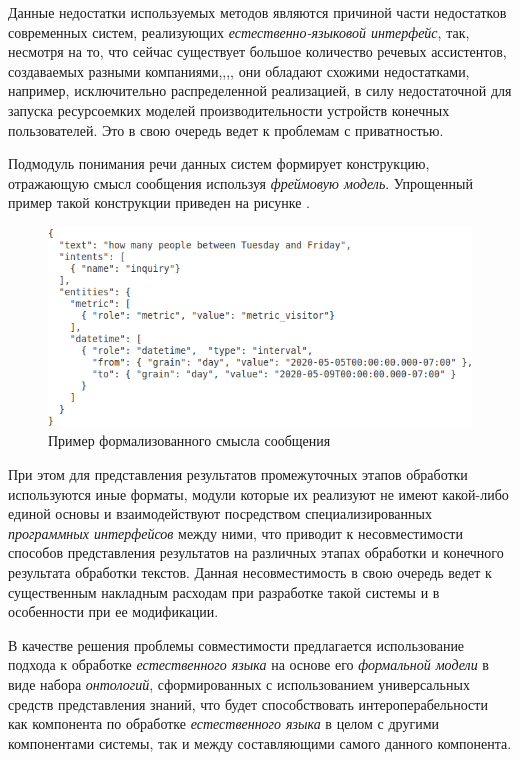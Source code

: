 Данные недостатки используемых методов являются причиной части недостатков современных систем, реализующих \textit{естественно-языковой интерфейс}, так, несмотря на то, что сейчас существует большое количество речевых ассистентов, создаваемых разными компаниями,,,, они обладают схожими недостатками, например, исключительно распределенной реализацией, в силу недостаточной для запуска ресурсоемких моделей производительности устройств конечных пользователей.
Это в свою очередь ведет к проблемам с приватностью.

Подмодуль понимания речи данных систем формирует конструкцию, отражающую смысл сообщения используя \textit{фреймовую модель}.
Упрощенный пример такой конструкции приведен на рисунке \textit{}.

\begin{figure}[h]
    \centerline{\includegraphics[scale=0.55]{images/part4/chapter_nl_interfaces/message_intents}}
    \caption{Пример формализованного смысла сообщения}
    \label{fig:message_intents}
\end{figure}

При этом для представления результатов промежуточных этапов обработки используются иные форматы, модули которые их реализуют не имеют какой-либо единой основы и взаимодействуют посредством специализированных \textit{программных интерфейсов} между ними, что приводит к несовместимости способов представления результатов на различных этапах обработки и конечного результата обработки текстов.
Данная несовместимость в свою очередь ведет к существенным накладным расходам при разработке такой системы и в особенности при ее модификации.

В качестве решения проблемы совместимости предлагается использование подхода к обработке \textit{естественного языка} на основе его \textit{формальной модели} в виде набора \textit{онтологий}, сформированных с использованием универсальных средств представления знаний, что будет способствовать интероперабельности как компонента по обработке \textit{естественного языка} в целом с другими компонентами системы, так и между составляющими самого данного компонента.

